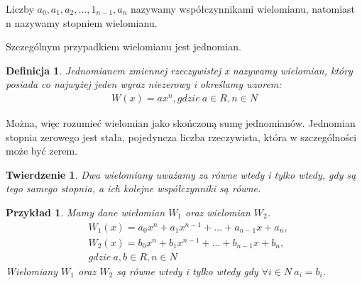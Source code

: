 \documentclass[twoside,a4paper]{book}
\newtheorem{theorem}{Twierdzenie}
\newtheorem{definition}{Definicja}
\newtheorem{example}{Przykład}
\begin{document}
Liczby $a_0, a_1, a_2, ..., 1_{n-1}, a_n$ nazywamy współczynnikami wielomianu, natomiast n nazywamy stopniem wielomianu.
	
Szczególnym przypadkiem wielomianu jest jednomian. 

\begin{definition}
	Jednomianem zmiennej rzeczywistej x nazywamy wielomian, który posiada co najwyżej jeden wyraz niezerowy i określamy wzorem:
	\begin{equation}
		\begin{split}
			W(x) = ax^n, gdzie\ a\in R, n \in N 
		\end{split}
	\end{equation}
\end{definition}

Można, więc rozumieć wielomian jako skończoną sumę jednomianów.
Jednomian stopnia zerowego jest stała, pojedyncza liczba rzeczywista, która w szczególności może być zerem.


\begin{theorem}
	Dwa wielomiany uważamy za równe wtedy i tylko wtedy, gdy są tego samego stopnia, a ich kolejne współczynniki są równe.
\end{theorem}

\begin{example}
	Mamy dane wielomian $W_1$ oraz wielomian $W_2$.
	\begin{equation}
	\begin{split}
	&W_1(x) = a_0x^n + a_1x^{n-1} + ... + a_{n-1}x + a_n, \\
	&W_2(x) = b_0x^n + b_1x^{n-1} + ... + b_{n-1}x + b_n, \\
	& gdzie\ a,b\in R, n \in N 
	\end{split}
	\end{equation}
	Wielomiany $W_1$ oraz $W_2 $ są równe wtedy i tylko wtedy gdy
	$ \forall{i\in N}\ a_i = b_i$.
\end{example}
\end{document}

